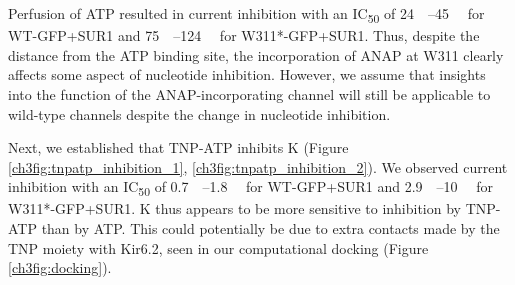 Perfusion of ATP resulted in current inhibition with an IC\textsubscript{50} of \SIrange{24}{45}{\micro\Molar} for WT-GFP+SUR1 and \SIrange{75}{124}{\micro\Molar} for W311*-GFP+SUR1.
Thus, despite the distance from the ATP binding site, the incorporation of ANAP at W311 clearly affects some aspect of nucleotide inhibition.
However, we assume that insights into the function of the ANAP-incorporating channel will still be applicable to wild-type channels despite the change in nucleotide inhibition.

Next, we established that TNP-ATP inhibits K\ATP{} (Figure \ref{ch3fig:tnpatp_inhibition_1}, \ref{ch3fig:tnpatp_inhibition_2}).
We observed current inhibition with an IC\textsubscript{50} of \SIrange{0.7}{1.8}{\micro\Molar} for WT-GFP+SUR1 and \SIrange{2.9}{10}{\micro\Molar} for W311*-GFP+SUR1.
K\ATP{} thus appears to be more sensitive to inhibition by TNP-ATP than by ATP.
This could potentially be due to extra contacts made by the TNP moiety with Kir6.2, seen in our computational docking (Figure \ref{ch3fig:docking}).

